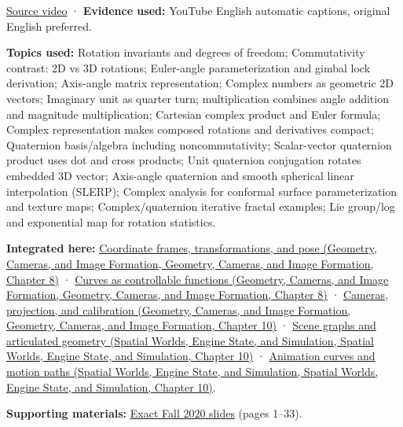 \href{https://www.youtube.com/watch?v=YF5ZUlKxSgE}{Source video} · \textbf{Evidence used:} YouTube English automatic captions, original English preferred.

\textbf{Topics used:} Rotation invariants and degrees of freedom; Commutativity contrast: 2D vs 3D rotations; Euler-angle parameterization and gimbal lock derivation; Axis-angle matrix representation; Complex numbers as geometric 2D vectors; Imaginary unit as quarter turn; multiplication combines angle addition and magnitude multiplication; Cartesian complex product and Euler formula; Complex representation makes composed rotations and derivatives compact; Quaternion basis/algebra including noncommutativity; Scalar-vector quaternion product uses dot and cross products; Unit quaternion conjugation rotates embedded 3D vector; Axis-angle quaternion and smooth spherical linear interpolation (SLERP); Complex analysis for conformal surface parameterization and texture maps; Complex/quaternion iterative fractal examples; Lie group/log and exponential map for rotation statistics.

\textbf{Integrated here:} \href{../03-Geometry-Cameras-and-Image-Formation/main.pdf\#nameddest=03-visual-computing-i-ch001-coordinate-frames-transformations-and-pose}{Coordinate frames, transformations, and pose (Geometry, Cameras, and Image Formation, Geometry, Cameras, and Image Formation, Chapter 8)} · \href{../03-Geometry-Cameras-and-Image-Formation/main.pdf\#nameddest=03-visual-computing-i-ch001-curves-as-controllable-functions}{Curves as controllable functions (Geometry, Cameras, and Image Formation, Geometry, Cameras, and Image Formation, Chapter 8)} · \href{../03-Geometry-Cameras-and-Image-Formation/main.pdf\#nameddest=03-visual-computing-i-ch003-cameras-projection-and-calibration}{Cameras, projection, and calibration (Geometry, Cameras, and Image Formation, Geometry, Cameras, and Image Formation, Chapter 10)} · \href{../05-Spatial-Worlds-Engine-State-and-Simulation/main.pdf\#nameddest=04-visual-computing-ii-ch029-scene-graphs-and-articulated-geometry}{Scene graphs and articulated geometry (Spatial Worlds, Engine State, and Simulation, Spatial Worlds, Engine State, and Simulation, Chapter 10)} · \href{../05-Spatial-Worlds-Engine-State-and-Simulation/main.pdf\#nameddest=04-visual-computing-ii-ch029-animation-curves-and-motion-paths}{Animation curves and motion paths (Spatial Worlds, Engine State, and Simulation, Spatial Worlds, Engine State, and Simulation, Chapter 10)}.

\textbf{Supporting materials:} \href{https://15462.courses.cs.cmu.edu/fall2020content/lectures/06_3drotations/06_3drotations_slides.pdf}{Exact Fall 2020 slides} (pages 1--33).

